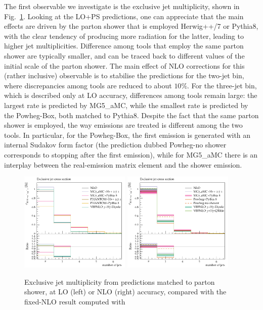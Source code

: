 The first observable we investigate is the exclusive jet multiplicity, shown in Fig.~\ref{fig:PSnjet}. Looking at the LO+PS predictions, one can appreciate that the
main effects are driven by the parton shower that is employed {\sc Herwig++/7} or {\sc Pythia8}, with the clear tendency of producing more radiation for the latter,
leading to higher jet multiplicities. Difference among tools that employ the same parton shower are typically smaller, and can be traced back to different values of the
initial scale of the parton shower. The main effect of NLO corrections for this (rather inclusive) observable is to stabilise the predictions for the two-jet bin, where discrepancies
among tools are reduced to about $10\%$. For the three-jet bin, which is described only at LO accuracy, differences among tools remain large: the largest rate is predicted by
{\sc MG5\_aMC}, while the smallest rate is predicted by the {\sc Powheg-Box}, both matched to {\sc Pythia8}. Despite the fact that the same parton shower is employed, the way emissions are treated
is different among the two tools. In particular, for the {\sc Powheg-Box}, the first emission is generated with an internal Sudakov form factor (the
prediction dubbed {\sc Powheg-no shower} corresponds to stopping after the first emission), while for {\sc MG5\_aMC} there is an
interplay between the real-emission matrix element and the shower emission.

\begin{figure}[hbt]
\centering
\includegraphics[width=0.47\textwidth]{figures/LOPS/jetsexclusive.pdf}
\includegraphics[width=0.47\textwidth]{figures/NLOPS/jetsexclusive.pdf}
\caption{Exclusive jet multiplicity from predictions matched to parton shower, at LO (left) or NLO (right) accuracy, compared with the fixed-NLO result
    computed with }
\label{fig:PSnjet}
\end{figure}
 
